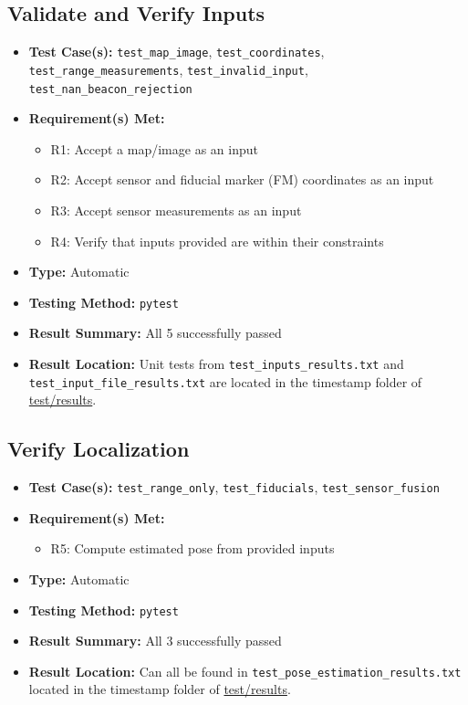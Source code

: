 \documentclass[12pt, titlepage]{article}
\begin{document}
\subsection{Validate and Verify Inputs}
\begin{itemize}
  \item \textbf{Test Case(s): }\texttt{test\_map\_image}, \texttt{test\_coordinates}, \texttt{test\_range\_measurements}, \texttt{test\_invalid\_input}, \texttt{test\_nan\_beacon\_rejection}
  \item \textbf{Requirement(s) Met: }
  \begin{itemize}
    \item R1: Accept a map/image as an input
    \item R2: Accept sensor and fiducial marker (FM) coordinates as an input
    \item R3: Accept sensor measurements as an input
    \item R4: Verify that inputs provided are within their constraints
  \end{itemize}
  \item \textbf{Type: }Automatic
  \item \textbf{Testing Method: }\texttt{pytest}
  \item \textbf{Result Summary: }All 5 successfully passed
  \item \textbf{Result Location: }Unit tests from \texttt{test\_inputs\_results.txt} and \texttt{test\_input\_file\_results.txt} are located in the timestamp folder of \href{https://github.com/AliyahJimoh/2D-Localizer/tree/main/test/results/}{test/results}.
\end{itemize}


\subsection{Verify Localization}
\begin{itemize}
  \item \textbf{Test Case(s): }\texttt{test\_range\_only}, \texttt{test\_fiducials}, \texttt{test\_sensor\_fusion}
  \item \textbf{Requirement(s) Met: }
  \begin{itemize}
    \item R5: Compute estimated pose from provided inputs
  \end{itemize}
  \item \textbf{Type: }Automatic
  \item \textbf{Testing Method: }\texttt{pytest}
  \item \textbf{Result Summary: }All 3 successfully passed
  \item \textbf{Result Location: }Can all be found in \texttt{test\_pose\_estimation\_results.txt} located in the timestamp folder of \href{https://github.com/AliyahJimoh/2D-Localizer/tree/main/test/results/}{test/results}.
\end{itemize}
\end{document}
